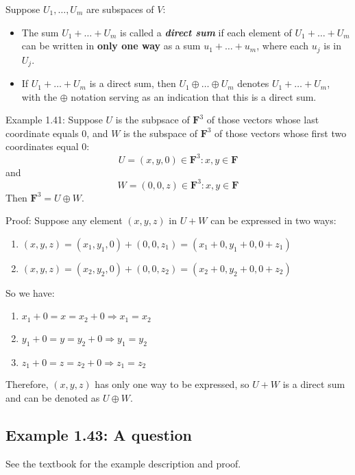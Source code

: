 \documentclass[12pt, letterpaper, oneside]{book}
\begin{document}
Suppose $U_1, \ldots, U_m$ are subspaces of $V$:
\begin{itemize}
  \item The sum $U_1 + \ldots + U_m$ is called a \textbf{\textit{direct sum}}
    if each element of $U_1 + \ldots + U_m$ can be written in \textbf{only one
    way} as a sum $u_1 + \ldots + u_m$, where each $u_j$ is in $U_j$.
  \item If $U_1 + \ldots + U_m$ is a direct sum, then $U_1 \oplus \ldots \oplus
    U_m$ denotes $U_1 + \ldots + U_m$, with the $\oplus$ notation serving as an
    indication that this is a direct sum.
\end{itemize}

Example 1.41: Suppose $U$ is the subpsace of $\mathbf{F}^3$ of those vectors whose
last coordinate equals $0$, and $W$ is the subspace of $\mathbf{F}^3$ of those
vectors whose first two coordinates equal $0$:
\[
  U = {(x, y, 0) \in \mathbf{F}^3: x, y \in \mathbf{F}}
\]
and
\[
  W = {(0, 0, z) \in \mathbf{F}^3: x, y \in \mathbf{F}}
\]
Then $\mathbf{F}^3 = U \oplus W$.

Proof: Suppose any element $(x, y, z)$ in $U+W$ can be expressed in two ways:
\begin{enumerate}
  \item $(x, y, z) = (x_1, y_1, 0) + (0, 0, z_1) = (x_1 + 0, y_1 + 0, 0 + z_1)$
  \item $(x, y, z) = (x_2, y_2, 0) + (0, 0, z_2) = (x_2 + 0, y_2 + 0, 0 + z_2)$
\end{enumerate}

So we have:
\begin{enumerate}
  \item $x_1 + 0 = x = x_2 + 0 \Rightarrow x_1 = x_2$
  \item $y_1 + 0 = y = y_2 + 0 \Rightarrow y_1 = y_2$
  \item $z_1 + 0 = z = z_2 + 0 \Rightarrow z_1 = z_2$
\end{enumerate}

Therefore, $(x, y, z)$ has only one way to be expressed, so $U+W$ is a direct
sum and can be denoted as $U \oplus W$.

\subsection{Example 1.43: A question}

See the textbook for the example description and proof.
\end{document}
